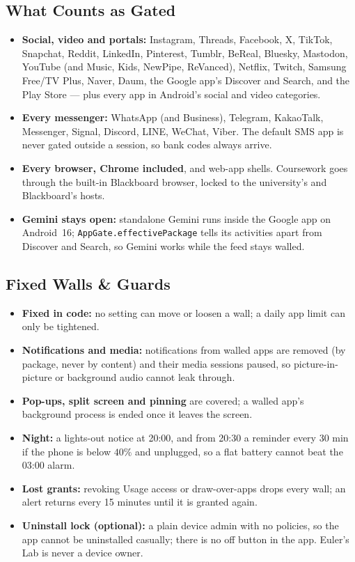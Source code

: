 \documentclass[11pt,a4paper]{article}
\begin{document}
\subsection{What Counts as Gated}
\begin{itemize}
  \item \textbf{Social, video and portals:} Instagram, Threads, Facebook, X, TikTok, Snapchat, Reddit, LinkedIn, Pinterest, Tumblr, BeReal, Bluesky, Mastodon, YouTube (and Music, Kids, NewPipe, ReVanced), Netflix, Twitch, Samsung Free/TV Plus, Naver, Daum, the Google app's Discover and Search, and the Play Store --- plus every app in Android's social and video categories.
  \item \textbf{Every messenger:} WhatsApp (and Business), Telegram, KakaoTalk, Messenger, Signal, Discord, LINE, WeChat, Viber. The default SMS app is never gated outside a session, so bank codes always arrive.
  \item \textbf{Every browser, Chrome included}, and web-app shells. Coursework goes through the built-in Blackboard browser, locked to the university's and Blackboard's hosts.
  \item \textbf{Gemini stays open:} standalone Gemini runs inside the Google app on Android~16; \texttt{AppGate.effectivePackage} tells its activities apart from Discover and Search, so Gemini works while the feed stays walled.
\end{itemize}

\subsection{Fixed Walls \& Guards}
\begin{itemize}
  \item \textbf{Fixed in code:} no setting can move or loosen a wall; a daily app limit can only be tightened.
  \item \textbf{Notifications and media:} notifications from walled apps are removed (by package, never by content) and their media sessions paused, so picture-in-picture or background audio cannot leak through.
  \item \textbf{Pop-ups, split screen and pinning} are covered; a walled app's background process is ended once it leaves the screen.
  \item \textbf{Night:} a lights-out notice at 20:00, and from 20:30 a reminder every 30 min if the phone is below $40\%$ and unplugged, so a flat battery cannot beat the 03:00 alarm.
  \item \textbf{Lost grants:} revoking Usage access or draw-over-apps drops every wall; an alert returns every 15 minutes until it is granted again.
  \item \textbf{Uninstall lock (optional):} a plain device admin with no policies, so the app cannot be uninstalled casually; there is no off button in the app. Euler's Lab is never a device owner.
\end{itemize}
\end{document}
